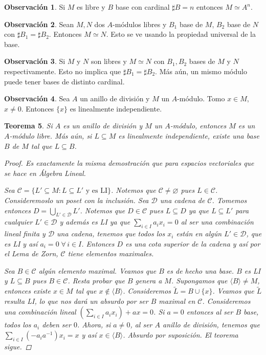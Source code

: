 \documentclass[12pt]{book}
\newtheorem{teo}{Teorema}[section]
\theoremstyle{definition}
\newtheorem{obs}[teo]{Observación}
\let\emptyset\varnothing
\begin{document}
\begin{obs}
Si $M$ es libre y $B$ base con cardinal $\sharp B=n$ entonces $M\simeq A^n$.
\end{obs}

\begin{obs}
Sean $M,N$ dos $A$-módulos libres y $B_1$ base de $M$, $B_2$ base de $N$ con $\sharp B_1 = \sharp B_2$. Entonces $M\simeq N$. Esto se ve usando la propiedad universal de la base.
\end{obs}

\begin{obs}
Si $M$ y $N$ son libres y $M\simeq N$ con $B_1,B_2$ bases de $M$ y $N$ respectivamente. Esto no implica que $\sharp B_1 = \sharp B_2$. Más aún, un mismo módulo puede tener bases de distinto cardinal.
\end{obs}

\begin{obs}
Sea $A$ un anillo de división y $M$ un $A$-módulo. Tomo $x\in M$, $x\neq 0$. Entonces $\{x\}$ es linealmente independiente.
\end{obs}

\begin{teo}
Si $A$ es un anillo de división y $M$ un $A$-módulo, entonces $M$ es un $A$-módulo libre. Más aún, si $L\subseteq M$ es linealmente independiente, existe una base $B$ de $M$ tal que $L\subseteq B$.
\begin{proof}
Es exactamente la misma demostración que para espacios vectoriales que se hace en Álgebra Lineal.

Sea $\mathcal{C} = \{L'\subseteq M : L\subseteq L' \text{ y es LI}\}$. Notemos que $\mathcal{C}\neq \emptyset$ pues $L\in\mathcal{C}$. Consideremoslo un poset con la inclusión. Sea $\mathcal{D}$ una cadena de $\mathcal{C}$. Tomemos entonces $D=\displaystyle\bigcup_{L'\in\mathcal{D}}L'$. Notemos que $D\in\mathcal{C}$ pues $L\subseteq D$ ya que $L\subseteq L'$ para cualquier $L'\in\mathcal{D}$ y además es LI ya que $\displaystyle\sum_{i\in I} a_ix_i = 0$ al ser una combinación lineal finita y $\mathcal{D}$ una cadena, tenemos que todos los $x_i$ están en algún $L'\in\mathcal{D}$, que es LI y así $a_i=0 \;\forall\, i\in I$. Entonces $D$ es una cota superior de la cadena y así por el Lema de Zorn, $\mathcal{C}$ tiene elementos maximales.

Sea $B\in\mathcal{C}$ algún elemento maximal. Veamos que $B$ es de hecho una base. $B$ es LI y $L\subseteq B$ pues $B\in\mathcal{C}$. Resta probar que $B$ genera a $M$. Supongamos que $\langle B\rangle \neq M$, entonces existe $x\in M$ tal que $x\notin \langle B\rangle$. Consideremos $\tilde{L}=B\cup \{x\}$. Veamos que $\tilde{L}$ resulta LI, lo que nos dará un absurdo por ser $B$ maximal en $\mathcal{C}$. Consideremos una combinación lineal $\left(\displaystyle\sum_{i\in I} a_i x_i\right) + ax = 0$. Si $a=0$ entonces al ser $B$ base, todos los $a_i$ deben ser $0$. Ahora, si $a\neq 0$, al ser $A$ anillo de división, tenemos que $\displaystyle\sum_{i\in I}(-a_i a^{-1})x_i = x$ y así $x\in \langle B\rangle$. Absurdo por suposición. El teorema sigue.
\end{proof}
\end{teo}
\end{document}
